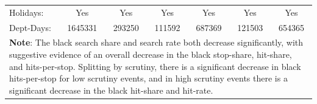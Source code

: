 \begin{tabular}{l*{6}{c}}
Holidays:   &         Yes         &         Yes         &         Yes         &         Yes         &         Yes         &         Yes         \\
Dept-Days:  &     1645331         &      293250         &      111592         &      687369         &      121503         &      654365         \\
\hline \multicolumn{7}{p{\linewidth}}{\textbf{Note}: The black search share and search rate both decrease significantly, with suggestive evidence of an overall decrease in the black stop-share, hit-share, and hits-per-stop. Splitting by scrutiny, there is a significant decrease in black hits-per-stop for low scrutiny events, and in high scrutiny events there is a significant decrease in the black hit-share and hit-rate.} \\ \hline \end{tabular}
